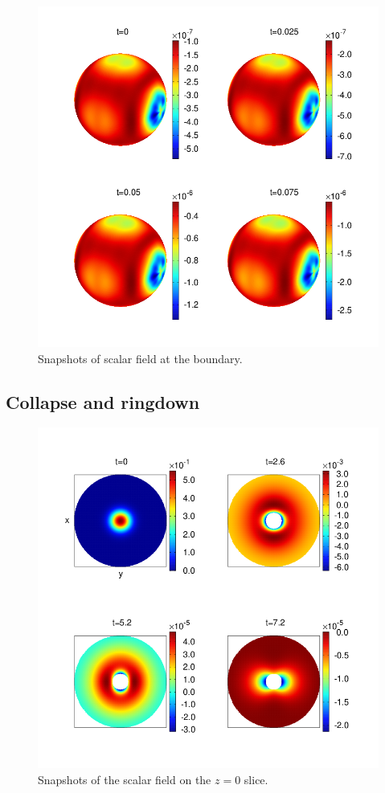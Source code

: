 \documentclass[12pt]{iopart} %
\begin{document}
\begin{figure}[h]
        \centering
        \includegraphics[width=5.0in,clip=true]{plots/bdyplots/L3/bdyphi/sphereplots_bdyphi_L3_2by2.png}
\parbox{5.0in}{\caption{Snapshots of scalar field at the boundary.
        }\label{fig:snapshotsenergydensity}}
\end{figure}

\subsection{Collapse and ringdown}\label{sec:results}

\begin{figure}[h]
        \centering
        \includegraphics[width=5.0in,clip=true]{plots/bulkplots/L3/phi1/phi1_L3_snapshots_2_2by2.png}
\parbox{5.0in}{\caption{Snapshots of the scalar field on the $z=0$ slice.
        }\label{fig:snapshotsscalarfield}}
\end{figure}
\end{document}
